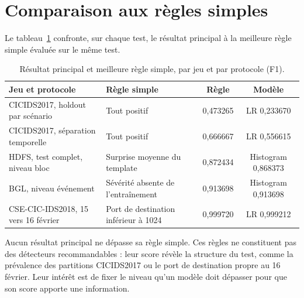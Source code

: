 
\section{Comparaison aux règles simples}
\label{sec:baselines-par-jeu}

Le tableau~\ref{tab:baselines-par-jeu} confronte, sur chaque test, le résultat principal à la meilleure règle simple évaluée sur le même test.

\begin{table}[H]
\centering
\caption{Résultat principal et meilleure règle simple, par jeu et par protocole (F1).}
\label{tab:baselines-par-jeu}
\small
\begin{tabularx}{\textwidth}{p{}Xcc}
\toprule
\textbf{Jeu et protocole} & \textbf{Règle simple} & \textbf{Règle} & \textbf{Modèle} \\
\midrule
CICIDS2017, holdout par scénario & Tout positif & 0,473265 & LR 0,233670 \\
CICIDS2017, séparation temporelle & Tout positif & 0,666667 & LR 0,556615 \\
HDFS, test complet, niveau bloc & Surprise moyenne du template & 0,872434 & Histogram 0,868373 \\
BGL, niveau événement & Sévérité absente de l'entraînement & 0,913698 & Histogram 0,913698 \\
CSE-CIC-IDS2018, 15 vers 16 février & Port de destination inférieur à 1024 & 0,999720 & LR 0,999212 \\
\bottomrule
\end{tabularx}
\end{table}

Aucun résultat principal ne dépasse sa règle simple. Ces règles ne constituent pas des détecteurs recommandables : leur score révèle la structure du test, comme la prévalence des partitions CICIDS2017 ou le port de destination propre au 16 février. Leur intérêt est de fixer le niveau qu'un modèle doit dépasser pour que son score apporte une information.
